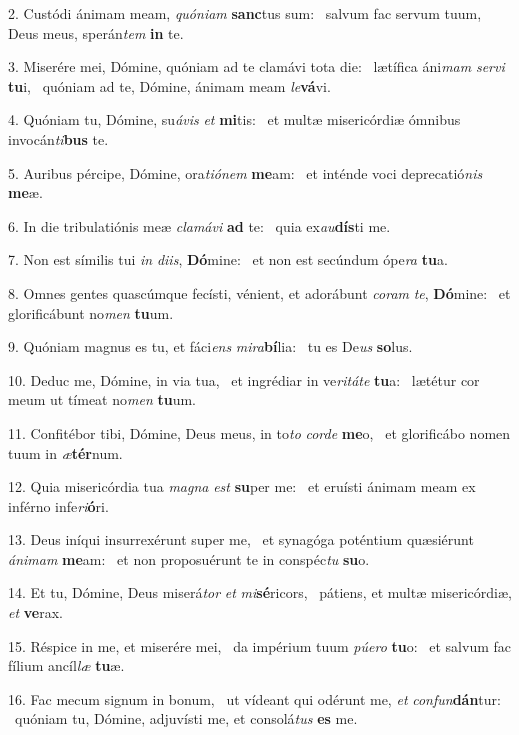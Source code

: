 2. Custódi ánimam meam, \textit{quón}\textit{i}\textit{am} \textbf{sanc}tus sum: \ast\  salvum fac servum tuum, Deus meus, sperán\textit{tem} \textbf{in} te.\

3. Miserére mei, Dómine, quóniam ad te clamávi tota die: \dag\  lætífica áni\textit{mam} \textit{ser}\textit{vi} \textbf{tu}i, \ast\  quóniam ad te, Dómine, ánimam meam \textit{le}\textbf{vá}vi.\

4. Quóniam tu, Dómine, su\textit{á}\textit{vis} \textit{et} \textbf{mi}tis: \ast\  et multæ misericórdiæ ómnibus invocán\textit{ti}\textbf{bus} te.\

5. Auribus pércipe, Dómine, ora\textit{ti}\textit{ó}\textit{nem} \textbf{me}am: \ast\  et inténde voci deprecatió\textit{nis} \textbf{me}æ.\

6. In die tribulatiónis meæ \textit{cla}\textit{má}\textit{vi} \textbf{ad} te: \ast\  quia ex\textit{au}\textbf{dís}ti me.\

7. Non est símilis tui \textit{in} \textit{di}\textit{is}, \textbf{Dó}mine: \ast\  et non est secúndum ópe\textit{ra} \textbf{tu}a.\

8. Omnes gentes quascúmque fecísti, vénient, et adorábunt \textit{co}\textit{ram} \textit{te}, \textbf{Dó}mine: \ast\  et glorificábunt no\textit{men} \textbf{tu}um.\

9. Quóniam magnus es tu, et fáci\textit{ens} \textit{mi}\textit{ra}\textbf{bí}lia: \ast\  tu es De\textit{us} \textbf{so}lus.\

10. Deduc me, Dómine, in via tua, \dag\  et ingrédiar in ve\textit{ri}\textit{tá}\textit{te} \textbf{tu}a: \ast\  lætétur cor meum ut tímeat no\textit{men} \textbf{tu}um.\

11. Confitébor tibi, Dómine, Deus meus, in to\textit{to} \textit{cor}\textit{de} \textbf{me}o, \ast\  et glorificábo nomen tuum in \textit{æ}\textbf{tér}num.\

12. Quia misericórdia tua \textit{ma}\textit{gna} \textit{est} \textbf{su}per me: \ast\  et eruísti ánimam meam ex inférno infe\textit{ri}\textbf{ó}ri.\

13. Deus iníqui insurrexérunt super me, \dag\  et synagóga poténtium quæsiérunt \textit{á}\textit{ni}\textit{mam} \textbf{me}am: \ast\  et non proposuérunt te in conspéc\textit{tu} \textbf{su}o.\

14. Et tu, Dómine, Deus miserá\textit{tor} \textit{et} \textit{mi}\textbf{sé}ricors, \ast\  pátiens, et multæ misericórdiæ, \textit{et} \textbf{ve}rax.\

15. Réspice in me, et miserére mei, \dag\  da impérium tuum \textit{pú}\textit{e}\textit{ro} \textbf{tu}o: \ast\  et salvum fac fílium ancíl\textit{læ} \textbf{tu}æ.\

16. Fac mecum signum in bonum, \dag\  ut vídeant qui odérunt me, \textit{et} \textit{con}\textit{fun}\textbf{dán}tur: \ast\  quóniam tu, Dómine, adjuvísti me, et consolá\textit{tus} \textbf{es} me.\

